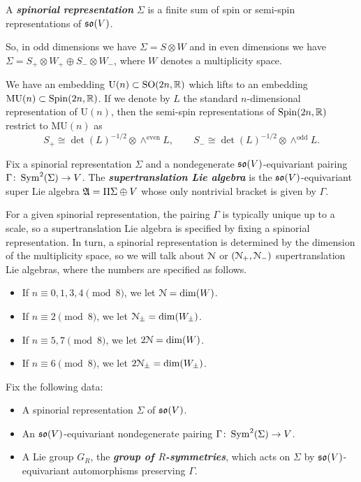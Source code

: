 \documentclass[10pt, oneside]{article}
\newcommand{\MU}{\mathrm{MU}}
\renewcommand{\U}{\mathrm{U}}
\newcommand{\defterm}[1]{\textbf{\emph{#1}}}
\begin{document}
\begin{definition}
A \defterm{spinorial representation} $\Sigma$ is a finite sum of spin or semi-spin representations of $\mathfrak{so}(V)$.
\end{definition}

So, in odd dimensions we have $\Sigma=S\otimes W$ and in even dimensions we have $\Sigma=S_+\otimes W_+\oplus S_-\otimes W_-$, where $W$ denotes a multiplicity space.

We have an embedding $\U(n)\subset \SO(2n, \RR)$ which lifts to an embedding $\MU(n)\subset \Spin(2n, \RR)$. If we denote by $L$ the standard $n$-dimensional representation of $\U(n)$, then the semi-spin representations of $\mathrm{Spin}(2n, \mathbb R)$ restrict to $\MU(n)$ as
\[S_+\cong \det(L)^{-1/2}\otimes \wedge^{\mathrm{even}} L,\qquad S_-\cong \det(L)^{-1/2}\otimes \wedge^{\mathrm{odd}} L.\]

\begin{definition}
Fix a spinorial representation $\Sigma$ and a nondegenerate $\mathfrak{so}(V)$-equivariant pairing $\Gamma\colon \operatorname{Sym}^2(\Sigma)\rightarrow V$. The \defterm{supertranslation Lie algebra} is the $\mathfrak{so}(V)$-equivariant super Lie algebra $\mathfrak A = \Pi\Sigma\oplus V$ whose only nontrivial bracket is given by $\Gamma$.
\end{definition}

For a given spinorial representation, the pairing $\Gamma$ is typically unique up to a scale, so a supertranslation Lie algebra is specified by fixing a spinorial representation. In turn, a spinorial representation is determined by the dimension of the multiplicity space, so we will talk about $\mathcal{N}$ or $(\mathcal{N}_+, \mathcal{N}_-)$ supertranslation Lie algebras, where the numbers are specified as follows.
\begin{itemize}
\item If $n\equiv 0, 1, 3, 4\pmod 8$, we let $\mathcal{N} = \dim(W)$.

\item If $n\equiv 2 \pmod 8$, we let $\mathcal{N}_{\pm}=\dim(W_{\pm})$.

\item If $n\equiv 5, 7\pmod 8$, we let $2\mathcal{N} = \dim(W)$.

\item If $n\equiv 6\pmod 8$, we let $2\mathcal{N}_{\pm} = \dim(W_{\pm})$.
\end{itemize}

Fix the following data:
\begin{itemize}
\item A spinorial representation $\Sigma$ of $\mathfrak{so}(V)$.

\item An $\mathfrak{so}(V)$-equivariant nondegenerate pairing $\Gamma\colon \operatorname{Sym}^2(\Sigma)\rightarrow V$.

\item A Lie group $G_R$, the \defterm{group of $R$-symmetries}, which acts on $\Sigma$ by $\mathfrak{so}(V)$-equivariant automorphisms preserving $\Gamma$.
\end{itemize}
\end{document}
